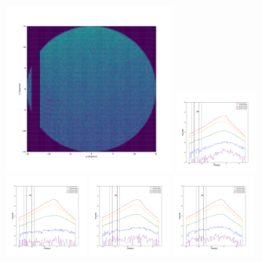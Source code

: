 \documentclass[12pt,prd]{article}
\begin{document}
\begin{figure}[h!]
\centering
\includegraphics[width=0.5\textwidth]{../figures/histogram2dgaiascan_l75_0_b66_4_ra216_0_dec41_0_npy.pdf}
\includegraphics[width=0.24\textwidth]{../figures/scanning_plotsgaiascan_l75_0_b66_4_ra216_0_dec41_0_npy_0.pdf}
\includegraphics[width=0.24\textwidth]{../figures/scanning_plotsgaiascan_l75_0_b66_4_ra216_0_dec41_0_npy_1.pdf}
\includegraphics[width=0.24\textwidth]{../figures/scanning_plotsgaiascan_l75_0_b66_4_ra216_0_dec41_0_npy_2.pdf}
\includegraphics[width=0.24\textwidth]{../figures/scanning_plotsgaiascan_l75_0_b66_4_ra216_0_dec41_0_npy_3.pdf}

\end{figure}
\end{document}
